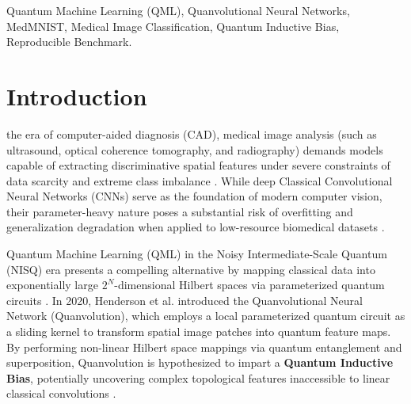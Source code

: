 \documentclass[journal]{IEEEtran}
\begin{document}
\begin{abstract}
This work offers an honest, reproducible, and evidence-based benchmark, clarifying realistic boundaries for quantum-classical hybrid architectures in computer-aided medical diagnosis.
\end{abstract}

\begin{IEEEkeywords}
Quantum Machine Learning (QML), Quanvolutional Neural Networks, MedMNIST, Medical Image Classification, Quantum Inductive Bias, Reproducible Benchmark.
\end{IEEEkeywords}

\section{Introduction}
 the era of computer-aided diagnosis (CAD), medical image analysis (such as ultrasound, optical coherence tomography, and radiography) demands models capable of extracting discriminative spatial features under severe constraints of data scarcity and extreme class imbalance \cite{litjens2017survey, yang2023medmnist, esteva2019guide}. While deep Classical Convolutional Neural Networks (CNNs) serve as the foundation of modern computer vision, their parameter-heavy nature poses a substantial risk of overfitting and generalization degradation when applied to low-resource biomedical datasets \cite{shorten2019survey}.

Quantum Machine Learning (QML) in the Noisy Intermediate-Scale Quantum (NISQ) era presents a compelling alternative by mapping classical data into exponentially large $2^N$-dimensional Hilbert spaces via parameterized quantum circuits \cite{biamonte2017quantum, cerezo2021variational}. In 2020, Henderson et al. \cite{henderson2020quanvolutional} introduced the Quanvolutional Neural Network (Quanvolution), which employs a local parameterized quantum circuit as a sliding kernel to transform spatial image patches into quantum feature maps. By performing non-linear Hilbert space mappings via quantum entanglement and superposition, Quanvolution is hypothesized to impart a \textbf{Quantum Inductive Bias}, potentially uncovering complex topological features inaccessible to linear classical convolutions \cite{huang2021power, vu2024exploring}.
\end{document}
